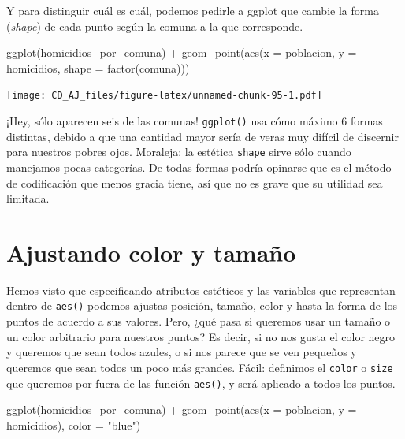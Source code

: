 \documentclass[
]{book}
\newenvironment{Shaded}{\begin{snugshade}}{\end{snugshade}}
\newcommand{\AttributeTok}[1]{\textcolor[rgb]{0.77,0.63,0.00}{#1}}
\newcommand{\FunctionTok}[1]{\textcolor[rgb]{0.00,0.00,0.00}{#1}}
\newcommand{\NormalTok}[1]{#1}
\newcommand{\SpecialCharTok}[1]{\textcolor[rgb]{0.00,0.00,0.00}{#1}}
\newcommand{\StringTok}[1]{\textcolor[rgb]{0.31,0.60,0.02}{#1}}
\begin{document}
Y para distinguir cuál es cuál, podemos pedirle a ggplot que cambie la forma (\emph{shape}) de cada punto según la comuna a la que corresponde.

\begin{Shaded}
\begin{Highlighting}[]
\FunctionTok{ggplot}\NormalTok{(homicidios\_por\_comuna) }\SpecialCharTok{+} 
    \FunctionTok{geom\_point}\NormalTok{(}\FunctionTok{aes}\NormalTok{(}\AttributeTok{x =}\NormalTok{ poblacion, }\AttributeTok{y =}\NormalTok{ homicidios, }\AttributeTok{shape =} \FunctionTok{factor}\NormalTok{(comuna)))}
\end{Highlighting}
\end{Shaded}

\texttt{[image: CD\_AJ\_files/figure-latex/unnamed-chunk-95-1.pdf]}

¡Hey, sólo aparecen seis de las comunas! \texttt{ggplot()} usa cómo máximo 6 formas distintas, debido a que una cantidad mayor sería de veras muy difícil de discernir para nuestros pobres ojos. Moraleja: la estética \texttt{shape} sirve sólo cuando manejamos pocas categorías. De todas formas podría opinarse que es el método de codificación que menos gracia tiene, así que no es grave que su utilidad sea limitada.

\hypertarget{ajustando-color-y-tamauxf1o}{%
\section{Ajustando color y tamaño}\label{ajustando-color-y-tamauxf1o}}

Hemos visto que especificando atributos estéticos y las variables que representan dentro
de \texttt{aes()} podemos ajustas posición, tamaño, color y hasta la forma de los puntos de acuerdo a sus valores. Pero, ¿qué pasa si queremos usar un tamaño o un color arbitrario para nuestros puntos? Es decir, si no nos gusta el color negro y queremos que sean todos azules, o si nos parece que se ven pequeños y queremos que sean todos un poco más grandes. Fácil: definimos el \texttt{color} o \texttt{size} que queremos por fuera de las función \texttt{aes()}, y será aplicado a todos los puntos.

\begin{Shaded}
\begin{Highlighting}[]
\FunctionTok{ggplot}\NormalTok{(homicidios\_por\_comuna) }\SpecialCharTok{+} 
    \FunctionTok{geom\_point}\NormalTok{(}\FunctionTok{aes}\NormalTok{(}\AttributeTok{x =}\NormalTok{ poblacion, }\AttributeTok{y =}\NormalTok{ homicidios), }\AttributeTok{color =} \StringTok{"blue"}\NormalTok{)}
\end{Highlighting}
\end{Shaded}
\end{document}
